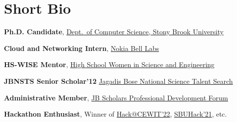 \documentclass[letterpaper,10pt]{article}
\begin{document}
\begin{minipage}{0.65\textwidth}
\section{Short Bio}
\resumeSubHeadingListStart
\item \textbf{Ph.D. Candidate}, \href{https://www.cs.stonybrook.edu/}{Dept.\ of Computer Science, Stony Brook University}
\item \textbf{Cloud and Networking Intern}, \href{https://www.bell-labs.com/}{Nokia Bell Labs}
\item \textbf{HS-WISE Mentor}, \href{https://www.stonybrook.edu/commcms/wise/pre-college/high_school.php}{High School Women in Science and Engineering}
\item \textbf{JBNSTS Senior Scholar'12} \href{https://jbnsts.ac.in}{Jagadis Bose National Science Talent Search}
\item \textbf{Administrative Member}, \href{https://sites.google.com/view/jbspdf/home}{JB Scholars Professional Development Forum}
\item \textbf{Hackathon Enthusiast}, Winner of \href{https://devpost.com/software/cryptopiens}{Hack@CEWIT'22}, \href{https://devpost.com/software/steganography-attack}{SBUHack'21}, etc.
\resumeSubHeadingListEnd
\end{minipage}
\begin{minipage}{0.2\textwidth}
\end{minipage}
\end{document}
